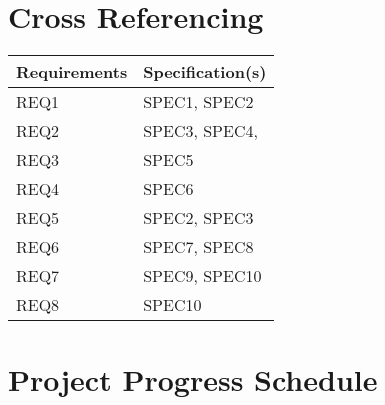 \documentclass{report}
\begin{document}
\section{Cross Referencing}
\centering
\begin{tabularx}{\textwidth}{|l|X|}
\hline
Requirements & Specification(s)\\
\hline
REQ1 &	SPEC1, SPEC2\\
\hline

REQ2 &	SPEC3, SPEC4,\\
\hline

REQ3 & 	SPEC5\\
\hline

REQ4 & 	SPEC6\\
\hline

REQ5 & 	SPEC2, SPEC3\\
\hline

REQ6 & 	SPEC7, SPEC8\\
\hline

REQ7 & 	SPEC9, SPEC10\\
\hline

REQ8 & 	SPEC10\\
\hline
\end{tabularx}

\section{Project Progress Schedule}
\label{sec:ganttchart}




\end{document}
